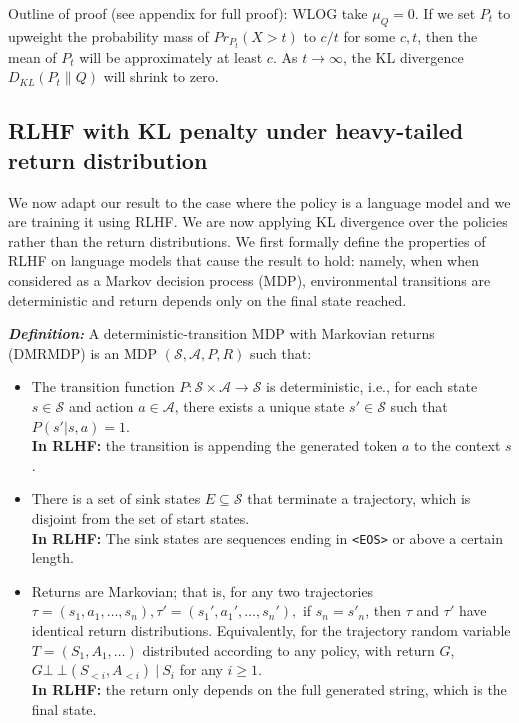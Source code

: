 \documentclass{article}
\theoremstyle{plain}
\theoremstyle{definition}
\theoremstyle{remark}
\begin{document}
Outline of proof (see appendix for full proof): WLOG take $\mu_Q = 0$. If we set $P_t$ to upweight the probability mass of $Pr_{P_t}(X > t)$ to $c/t$ for some $c, t$, then the mean of $P_t$ will be approximately at least $c$. As $t \to \infty$, the KL divergence $D_{KL}(P_t \| Q)$ will shrink to zero.

\hypertarget{theorem-about-RLHF-with-KL-penalty}{%
\subsection{RLHF with KL penalty under heavy-tailed return distribution}}

We now adapt our result to the case where the policy is a language model and we are training it using RLHF. We are now applying KL divergence over the policies rather than the return distributions. We first formally define the properties of RLHF on language models that cause the result to hold: namely, when when considered as a Markov decision process (MDP), environmental transitions are deterministic and return depends only on the final state reached.

\textbf{\emph{Definition:}} A deterministic-transition MDP with
Markovian returns (DMRMDP) is an MDP \((\mathcal S, \mathcal A, P, R)\)
such that:

\begin{itemize}
\item
  The transition function
  \(P: \mathcal{S} \times \mathcal{A} \to \mathcal{S}\) is
  deterministic, i.e., for each state \(s \in \mathcal{S}\) and action
  \(a \in \mathcal{A}\), there exists a unique state
  \(s' \in \mathcal{S}\) such that \(P(s' | s, a) = 1\). \\ \textbf{In RLHF:} the transition is appending the generated token $a$ to the context $s$.
\item
  There is a set of sink states \(E \subseteq \mathcal S\) that
  terminate a trajectory, which is disjoint from the set of start
  states. \\ \textbf{In RLHF:} The sink states are sequences ending in \texttt{<EOS>} or above a certain length.
\item
  Returns are Markovian; that is, for any two trajectories
  \(\tau=(s_1, a_1, \dots, s_n), \tau'=(s_1', a_1', \dots, s_n'),\) if
  \(s_{n}= s'_{n}\), then \(\tau\) and \(\tau'\) have identical return
  distributions. Equivalently, for the trajectory random variable
  \(T=(S_1, A_1, \dots)\) distributed according to any policy, with
  return \(G\), \(G \bot\!\!\!\!\!\ \bot (S_{<i}, A_{<i}) \ |\ S_i\) for
  any \(i \ge 1\). \\ \textbf{In RLHF:} the return only depends on the full generated string, which is the final state.
\end{itemize}
\end{document}

